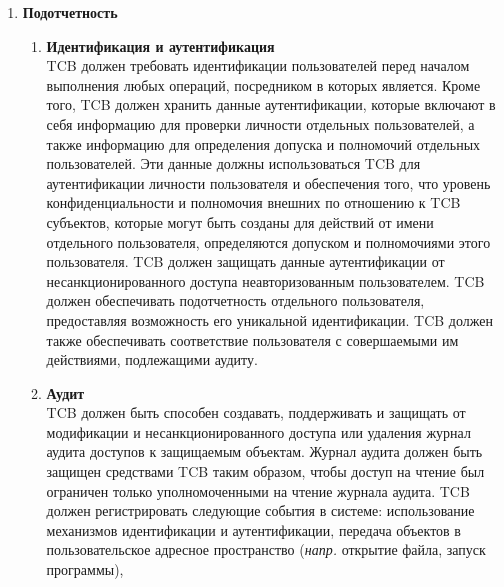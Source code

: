 \begin{enumerate}
\begin{enumerate}
\begin{enumerate}
\begin{enumerate}
                неиерархические категории уровня конфиденциальности субъекта включены в неиерархические категории уровня конфиденциальности объекта. Идентификационные и аутентификационные данные должны
                использоваться TCB для удостоверения личности пользователя и для обеспечения того, чтобы уровень конфиденциальности и авторизация субъектов, внешних для TCB, которые могут быть созданы для
                деятельности от имени отдельного пользователя, определялись уровнем доступа и авторизацией этого пользователя.
            \end{enumerate}
            \item{\textbf{Подотчетность}}
            \begin{enumerate}
                \item{\textbf{Идентификация и аутентификация}}\\
                TCB должен требовать идентификации пользователей перед началом выполнения любых операций, посредником в которых является. Кроме того, TCB должен хранить данные аутентификации,
                которые включают в себя информацию для проверки личности отдельных пользователей, а также информацию для определения допуска и полномочий отдельных пользователей. Эти данные должны
                использоваться TCB для аутентификации личности пользователя и обеспечения того, что уровень конфиденциальности и полномочия внешних по отношению к TCB субъектов, которые
                могут быть созданы для действий от имени отдельного пользователя, определяются допуском и полномочиями этого пользователя. TCB должен защищать данные аутентификации от
                несанкционированного доступа неавторизованным пользователем. TCB должен обеспечивать подотчетность отдельного пользователя, предоставляя возможность его уникальной идентификации.
                TCB должен также обеспечивать соответствие пользователя с совершаемыми им действиями, подлежащими аудиту.
                \item{\textbf{Аудит}}\\
                TCB должен быть способен создавать, поддерживать и защищать от модификации и несанкционированного доступа или удаления журнал аудита доступов к защищаемым объектам. Журнал аудита
                должен быть защищен средствами TCB таким образом, чтобы доступ на чтение был ограничен только уполномоченными на чтение журнала аудита. TCB должен регистрировать следующие события
                в системе: использование механизмов идентификации и аутентификации, передача объектов в пользовательское адресное пространство (\textit{напр.} открытие файла, запуск программы),

\end{enumerate}
\end{enumerate}
\end{enumerate}
\end{enumerate}
